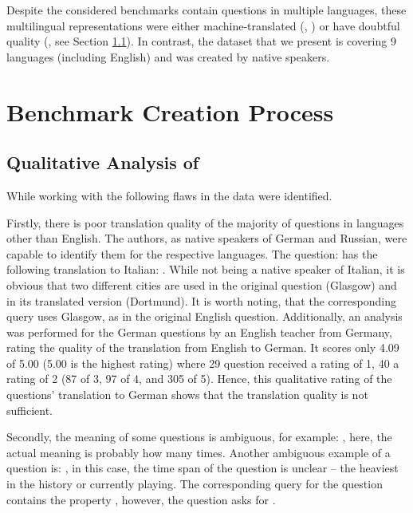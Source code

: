 \documentclass[conference]{IEEEtran}
\begin{document}
Despite the considered benchmarks contain questions in multiple languages, these multilingual representations were either machine-translated (, \CWQ) or have doubtful quality (, see Section \ref{ssec:qualitative_analysis_qald9}).
In contrast, the dataset that we present is covering 9 languages (including English) and was created by native speakers.
\section{\QALDplus Benchmark Creation Process}\label{sec:qald_plus_creation}
\subsection{Qualitative Analysis of }\label{ssec:qualitative_analysis_qald9}
While working with  the following flaws in the data were identified.

Firstly, there is poor translation quality of the majority of questions in languages other than English.
The authors, as native speakers of German and Russian, were capable to identify them for the respective languages.
The question:  has the following translation to Italian: .
While not being a native speaker of Italian, it is obvious that two different cities are used in the original question (Glasgow) and in its translated version (Dortmund).
It is worth noting, that the corresponding \SPARQL query uses Glasgow, as in the original English question.
Additionally, an analysis was performed for the German questions by an English teacher from Germany, rating the quality of the translation from English to German. 
It scores only 4.09 of 5.00 (5.00 is the highest rating) where 29 question received a rating of 1, 40 a rating of 2 (87 of 3, 97 of 4, and 305 of 5). 
Hence, this qualitative rating of the questions' translation to German shows that the translation quality is not sufficient.

Secondly, the meaning of some questions is ambiguous, for example: , here, the actual meaning is probably how many times.
Another ambiguous example of a question is: , in this case, the time span of the question is unclear -- the heaviest in the history or currently playing.
The corresponding \SPARQL query for the question  contains the property , however, the question asks for .
\end{document}

